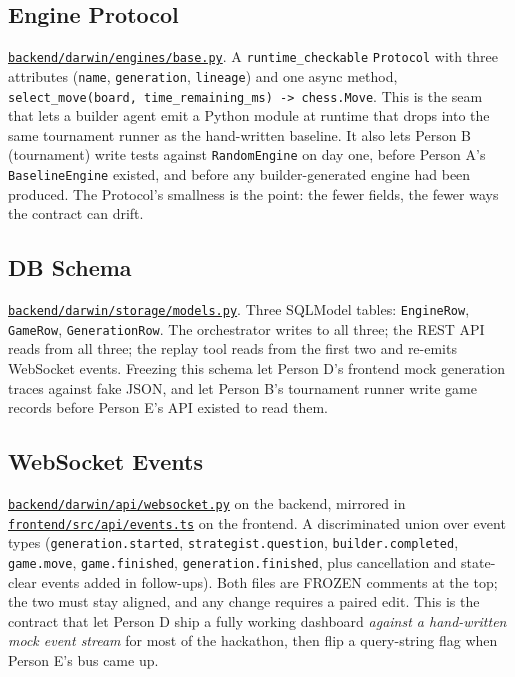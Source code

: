 \documentclass[11pt]{article}
\begin{document}
\subsection{Engine Protocol}
\href{run:../backend/darwin/engines/base.py}{\texttt{backend/darwin/engines/base.py}}.
A \texttt{runtime\_checkable} \texttt{Protocol} with three attributes
(\texttt{name}, \texttt{generation}, \texttt{lineage}) and one async
method, \texttt{select\_move(board, time\_remaining\_ms) -> chess.Move}.
This is the seam that lets a builder agent emit a Python module at
runtime that drops into the same tournament runner as the hand-written
baseline. It also lets Person B (tournament) write tests against
\texttt{RandomEngine} on day one, before Person A's
\texttt{BaselineEngine} existed, and before any builder-generated
engine had been produced. The Protocol's smallness is the point: the
fewer fields, the fewer ways the contract can drift.

\subsection{DB Schema}
\href{run:../backend/darwin/storage/models.py}{\texttt{backend/darwin/storage/models.py}}.
Three SQLModel tables: \texttt{EngineRow}, \texttt{GameRow},
\texttt{GenerationRow}. The orchestrator writes to all three; the
REST API reads from all three; the replay tool reads from the first two
and re-emits WebSocket events. Freezing this schema let Person D's
frontend mock generation traces against fake JSON, and let Person B's
tournament runner write game records before Person E's API existed to
read them.

\subsection{WebSocket Events}
\href{run:../backend/darwin/api/websocket.py}{\texttt{backend/darwin/api/websocket.py}}
on the backend, mirrored in
\href{run:../frontend/src/api/events.ts}{\texttt{frontend/src/api/events.ts}}
on the frontend. A discriminated union over event types
(\texttt{generation.started}, \texttt{strategist.question},
\texttt{builder.completed}, \texttt{game.move}, \texttt{game.finished},
\texttt{generation.finished}, plus cancellation and state-clear events
added in follow-ups). Both files are FROZEN comments at the top; the
two must stay aligned, and any change requires a paired edit. This is
the contract that let Person D ship a fully working dashboard
\emph{against a hand-written mock event stream} for most of the
hackathon, then flip a query-string flag when Person E's bus came up.
\end{document}
